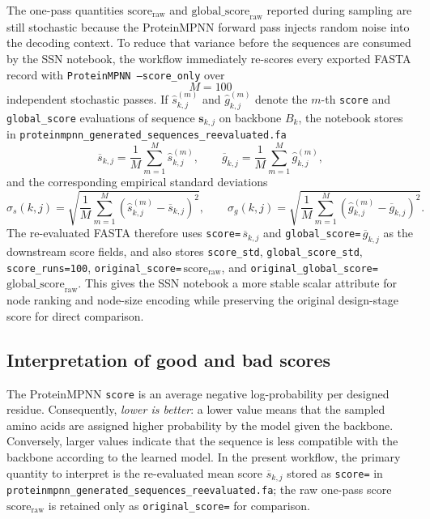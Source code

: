 \documentclass[11pt,a4paper]{article}
\begin{document}
The one-pass quantities $\mathrm{score}_{\mathrm{raw}}$ and $\mathrm{global\_score}_{\mathrm{raw}}$ reported during sampling are still stochastic because the ProteinMPNN forward pass injects random noise into the decoding context. To reduce that variance before the sequences are consumed by the SSN notebook, the workflow immediately re-scores every exported FASTA record with \texttt{ProteinMPNN --score\_only} over
\[
M=100
\]
independent stochastic passes. If $\widehat s^{(m)}_{k,j}$ and $\widehat g^{(m)}_{k,j}$ denote the $m$-th \texttt{score} and \texttt{global\_score} evaluations of sequence $\bm{s}_{k,j}$ on backbone $B_k$, the notebook stores in \texttt{proteinmpnn\_generated\_sequences\_reevaluated.fa}
\[
\overline s_{k,j}=\frac{1}{M}\sum_{m=1}^{M}\widehat s^{(m)}_{k,j},
\qquad
\overline g_{k,j}=\frac{1}{M}\sum_{m=1}^{M}\widehat g^{(m)}_{k,j},
\]
and the corresponding empirical standard deviations
\[
\sigma_s(k,j)=\sqrt{\frac{1}{M}\sum_{m=1}^{M}\left(\widehat s^{(m)}_{k,j}-\overline s_{k,j}\right)^2},
\qquad
\sigma_g(k,j)=\sqrt{\frac{1}{M}\sum_{m=1}^{M}\left(\widehat g^{(m)}_{k,j}-\overline g_{k,j}\right)^2}.
\]
The re-evaluated FASTA therefore uses \texttt{score=}\,$\overline s_{k,j}$ and \texttt{global\_score=}\,$\overline g_{k,j}$ as the downstream score fields, and also stores \texttt{score\_std}, \texttt{global\_score\_std}, \texttt{score\_runs=100}, \texttt{original\_score=}\,$\mathrm{score}_{\mathrm{raw}}$, and \texttt{original\_global\_score=}\,$\mathrm{global\_score}_{\mathrm{raw}}$. This gives the SSN notebook a more stable scalar attribute for node ranking and node-size encoding while preserving the original design-stage score for direct comparison.

\subsection{Interpretation of good and bad scores}

The ProteinMPNN \texttt{score} is an average negative log-probability per designed residue. Consequently, \emph{lower is better}: a lower value means that the sampled amino acids are assigned higher probability by the model given the backbone. Conversely, larger values indicate that the sequence is less compatible with the backbone according to the learned model. In the present workflow, the primary quantity to interpret is the re-evaluated mean score $\overline s_{k,j}$ stored as \texttt{score=} in \texttt{proteinmpnn\_generated\_sequences\_reevaluated.fa}; the raw one-pass score $\mathrm{score}_{\mathrm{raw}}$ is retained only as \texttt{original\_score=} for comparison.
\end{document}
